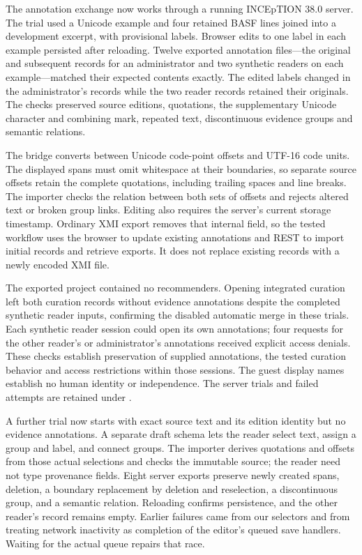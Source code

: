 The annotation exchange now works through a running INCEpTION 38.0 server.
The trial used a Unicode example and four retained BASF lines joined into a
development excerpt, with provisional labels. Browser edits to one label in
each example persisted after reloading. Twelve exported annotation files---the
original and subsequent records for an administrator and two synthetic readers
on each example---matched their expected contents exactly. The edited labels
changed in the administrator's records while the two reader records retained
their originals. The checks preserved source editions, quotations, the
supplementary Unicode character and combining mark, repeated text,
discontinuous evidence groups and semantic relations.

The bridge converts between Unicode code-point offsets and UTF-16 code units.
The displayed spans must omit whitespace at their boundaries, so separate
source offsets retain the complete quotations, including trailing spaces and
line breaks.
The importer checks the relation between both sets of offsets and rejects
altered text or broken group links. Editing also requires the server's current
storage timestamp. Ordinary XMI export removes that internal field, so the
tested workflow uses the browser to update existing annotations and REST to
import initial records and retrieve exports. It does not replace existing
records with a newly encoded XMI file.

The exported project contained no recommenders. Opening integrated curation
left both curation records without evidence annotations despite the completed
synthetic reader inputs, confirming the disabled automatic merge in these
trials. Each synthetic reader session could open its own annotations; four
requests for the other reader's or administrator's annotations received explicit
access denials. These checks establish preservation of supplied annotations,
the tested curation behavior and access restrictions within those sessions.
The guest display names establish no human identity or independence. The
server trials and failed attempts are retained under
.

A further trial now starts with exact source text and its edition identity but
no evidence annotations. A separate draft schema lets the reader select text,
assign a group and label, and connect groups. The importer derives quotations
and offsets from those actual selections and checks the immutable source; the
reader need not type provenance fields. Eight server exports preserve newly
created spans, deletion, a boundary replacement by deletion and reselection,
a discontinuous group, and a semantic relation. Reloading confirms persistence,
and the other reader's record remains empty. Earlier failures came from our
selectors and from treating network inactivity as completion of the editor's
queued save handlers. Waiting for the actual queue repairs that race.

